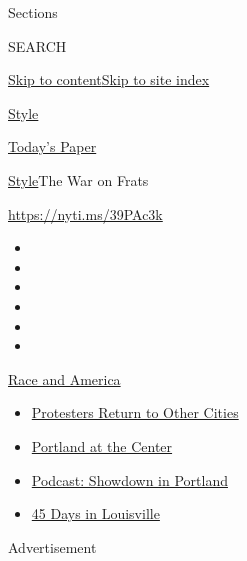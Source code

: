 Sections

SEARCH

\protect\hyperlink{site-content}{Skip to
content}\protect\hyperlink{site-index}{Skip to site index}

\href{https://www.nytimes.com/section/style}{Style}

\href{https://myaccount.nytimes.com/auth/login?response_type=cookie\&client_id=vi}{}

\href{https://www.nytimes.com/section/todayspaper}{Today's Paper}

\href{/section/style}{Style}\textbar{}The War on Frats

\url{https://nyti.ms/39PAc3k}

\begin{itemize}
\item
\item
\item
\item
\item
\item
\end{itemize}

\href{https://www.nytimes.com/news-event/george-floyd-protests-minneapolis-new-york-los-angeles?action=click\&pgtype=Article\&state=default\&region=TOP_BANNER\&context=storylines_menu}{Race
and America}

\begin{itemize}
\tightlist
\item
  \href{https://www.nytimes.com/2020/07/26/us/protests-portland-seattle-trump.html?action=click\&pgtype=Article\&state=default\&region=TOP_BANNER\&context=storylines_menu}{Protesters
  Return to Other Cities}
\item
  \href{https://www.nytimes.com/2020/07/24/us/portland-oregon-protests-white-race.html?action=click\&pgtype=Article\&state=default\&region=TOP_BANNER\&context=storylines_menu}{Portland
  at the Center}
\item
  \href{https://www.nytimes.com/2020/07/23/podcasts/the-daily/portland-protests.html?action=click\&pgtype=Article\&state=default\&region=TOP_BANNER\&context=storylines_menu}{Podcast:
  Showdown in Portland}
\item
  \href{https://www.nytimes.com/interactive/2020/07/16/us/black-lives-matter-protests-louisville-breonna-taylor.html?action=click\&pgtype=Article\&state=default\&region=TOP_BANNER\&context=storylines_menu}{45
  Days in Louisville}
\end{itemize}

Advertisement

